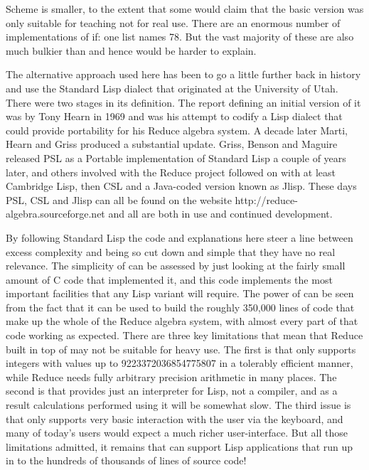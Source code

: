 Scheme is smaller, to the extent that some would claim that the basic
version was only suitable for teaching not for real use. There are
an enormous number of implementations of if: one list names 78. But the
vast majority of these are also much bulkier than \vsl{} and hence would be
harder to explain.

The alternative approach used here has been to go a little further back in
history and use the Standard Lisp dialect that originated at the University
of Utah. There were two stages in its definition. 
The report defining an initial version of it was by Tony Hearn in
1969\cite{StdLisp1} and was his attempt to codify a Lisp dialect that
could provide portability for his Reduce algebra system\cite{Reduce}. A
decade later Marti, Hearn and Griss produced a substantial update\cite{StdLisp2}.
Griss, Benson and Maguire released PSL\cite{PSL} as a Portable implementation
of Standard Lisp a couple of years later, and others involved with the
Reduce project followed on with at least Cambridge Lisp\cite{Camlisp},
then CSL\cite{CSL} and a Java-coded version known as Jlisp\cite{Jlisp}. These
days PSL, CSL and Jlisp can all be found on the website
{\tx http://reduce-algebra.sourceforge.net} and all are both in use and
continued development.

By following Standard Lisp the code and explanations here steer a line between
excess complexity and being so cut down and simple that they have no
real relevance. The simplicity of \vsl can be assessed by just looking at
the fairly small amount of C code that implemented it, and this code
implements the most important facilities that any Lisp variant will require.
The power of \vsl{} can be seen from the fact that it can be used to build
the roughly 350,000 lines of code that make up the whole of the Reduce algebra
system, with almost every part of that code working as expected. There are
three key limitations that mean that Reduce built in top of \vsl{} may not
be suitable for heavy use. The first is that \vsl{} only supports
integers with values up to 9223372036854775807 in a tolerably
efficient manner, while Reduce needs fully
arbitrary precision arithmetic in many places. The second is that \vsl{}
provides just an interpreter for Lisp, not a compiler, and as a result
calculations performed using it will be somewhat slow. The third issue is that
\vsl{} only supports very basic interaction with the user via the keyboard, and
many of today's users would expect a much richer user-interface. But all those
limitations admitted, it remains that \vsl{} can support Lisp applications
that run up in to the hundreds of thousands of lines of source code!

